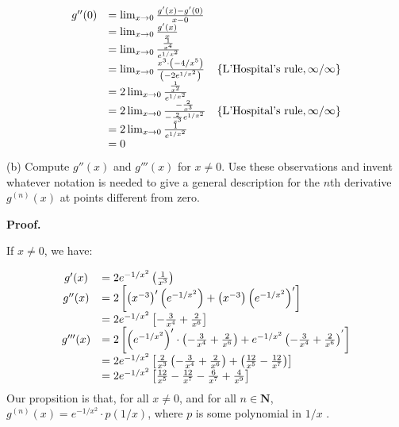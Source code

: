 \documentclass[10pt]{article}
\begin{document}
\begin{equation*}
\begin{array}{ c l c }
g''( 0) & =\lim _{x\rightarrow 0}\frac{g'( x) -g'( 0)}{x-0} & \\
 & =\lim _{x\rightarrow 0}\frac{g'( x)}{x} & \\
 & =\lim _{x\rightarrow 0}\frac{\frac{1}{x^{4}}}{e^{1/x^{2}}} & \\
 & =\lim _{x\rightarrow 0}\frac{x^{3} \cdot \left( -4/x^{5}\right)}{\left( -2e^{1/x^{2}}\right)} & \left\{\text{L'Hospital's rule} ,\infty /\infty \right\}\\
 & =2\lim _{x\rightarrow 0}\frac{\frac{1}{x^{2}}}{e^{1/x^{2}}} & \\
 & =2\lim _{x\rightarrow 0}\frac{-\frac{2}{x^{3}}}{-\frac{2}{x^{3}} e^{1/x^{2}}} & \left\{\text{L'Hospital's rule} ,\infty /\infty \right\}\\
 & =2\lim _{x\rightarrow 0}\frac{1}{e^{1/x^{2}}} & \\
 & =0 & 
\end{array}
\end{equation*}
(b) Compute $\displaystyle g''( x)$ and $\displaystyle g'''( x)$ for $\displaystyle x\neq 0$. Use these observations and invent whatever notation is needed to give a general description for the $\displaystyle n$th derivative $\displaystyle g^{( n)}( x)$ at points different from zero. 



\textbf{Proof.}



If $\displaystyle x\neq 0$, we have:


\begin{equation*}
\begin{array}{ c l }
g'( x) & =2e^{-1/x^{2}}\left(\frac{1}{x^{3}}\right)\\
g''( x) & =2\left[\left( x^{-3}\right) '\left( e^{-1/x^{2}}\right) +\left( x^{-3}\right)\left( e^{-1/x^{2}}\right) '\right]\\
 & =2e^{-1/x^{2}}\left[ -\frac{3}{x^{4}} +\frac{2}{x^{6}}\right]\\
g'''( x) & =2\left[\left( e^{-1/x^{2}}\right) '\cdot \left( -\frac{3}{x^{4}} +\frac{2}{x^{6}}\right) +e^{-1/x^{2}}\left( -\frac{3}{x^{4}} +\frac{2}{x^{6}}\right)^{'}\right]\\
 & =2e^{-1/x^{2}}\left[\frac{2}{x^{3}}\left( -\frac{3}{x^{4}} +\frac{2}{x^{6}}\right) +\left(\frac{12}{x^{5}} -\frac{12}{x^{7}}\right)\right]\\
 & =2e^{-1/x^{2}}\left[\frac{12}{x^{5}} -\frac{12}{x^{7}} -\frac{6}{x^{7}} +\frac{4}{x^{9}}\right]
\end{array}
\end{equation*}
Our propsition is that, for all $\displaystyle x\neq 0$, and for all $\displaystyle n\in \mathbf{N}$, $\displaystyle g^{( n)}( x) =e^{-1/x^{2}} \cdot p( 1/x)$, where $\displaystyle p$ is some polynomial in $\displaystyle 1/x$ . 
\end{document}

